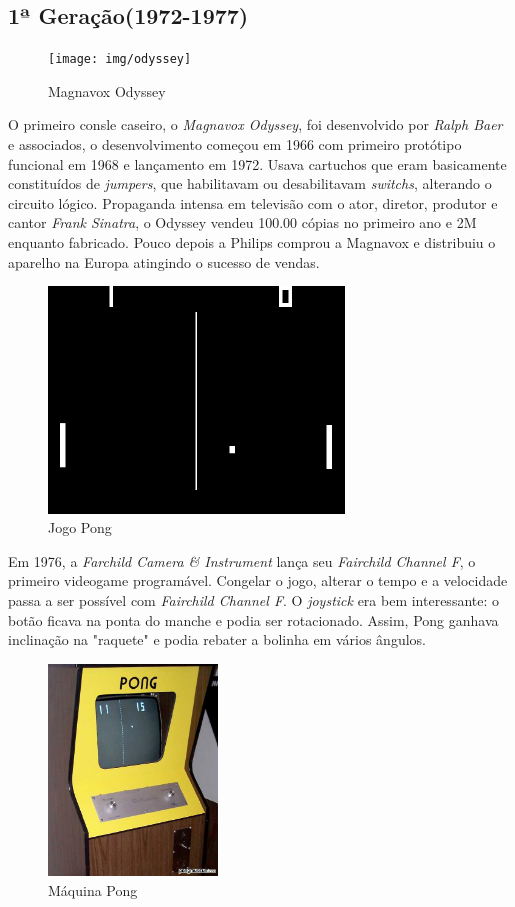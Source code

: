 \documentclass[paper=a4, fontsize=11pt]{scrartcl}	%
\numberwithin{equation}{section}															%
\numberwithin{figure}{section}																%
\numberwithin{table}{section}																%
\begin{document}
\subsection{1ª Geração(1972-1977)}
\begin{figure}[h!]
	\centering
    \texttt{[image: img/odyssey]}
    \caption{Magnavox Odyssey}
\end{figure}
O primeiro consle caseiro, o \textit{Magnavox Odyssey}, foi desenvolvido por \textit{Ralph Baer} e associados, o desenvolvimento começou em 1966 com primeiro protótipo funcional em 1968 e lançamento em 1972. Usava cartuchos que eram basicamente constituídos de \textit{jumpers}, que habilitavam ou desabilitavam \textit{switchs}, alterando o circuito lógico. Propaganda intensa em televisão com o ator, diretor, produtor e cantor \textit{Frank Sinatra}, o Odyssey vendeu 100.00 cópias no primeiro ano e 2M enquanto fabricado. Pouco depois a Philips comprou a Magnavox e distribuiu o aparelho na Europa atingindo o sucesso de vendas.\\
\begin{figure}
	\centering
    \includegraphics[width=0.7\textwidth]{img/pongpic}
    \caption{Jogo Pong}
\end{figure}
Em 1976, a \textit{Farchild Camera \& Instrument} lança seu \textit{Fairchild Channel F}, o primeiro videogame programável. Congelar o jogo, alterar o tempo e a velocidade passa a ser possível com \textit{Fairchild Channel F}. O \textit{joystick} era bem interessante: o botão ficava na ponta do manche e podia ser rotacionado. Assim, Pong ganhava inclinação na "raquete" e podia rebater a bolinha em vários ângulos.\\
\begin{figure}
	\centering
    \includegraphics[width=0.4\textwidth]{img/pong2}
    \caption{Máquina Pong}
\end{figure}
\end{document}
